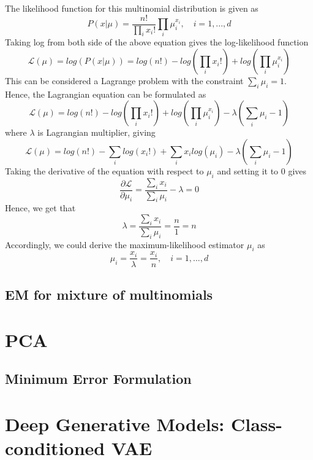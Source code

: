 \documentclass[12pt,a4paper]{article}
\begin{document}
	\noindent The likelihood function for this multinomial distribution is given as
	\begin{equation}
		P(x|\mu) = \frac{n!}{\prod_{i}x_i!}\prod_{i}\mu^{x_i}_i,\quad i=1, ..., d
	\end{equation}
	Taking log from both side of the above equation gives the log-likelihood function
	\begin{equation}
		\mathcal{L}(\mu) = log(P(x|\mu)) = log(n!)- log(\prod_{i}x_i!) +log(\prod_{i}\mu^{x_i}_i)
	\end{equation}
	This can be considered a Lagrange problem with the constraint $\sum_{i}\mu_i=1$. Hence, the Lagrangian equation can be formulated as
	\begin{equation}
		\mathcal{L}(\mu) = log(n!)- log(\prod_{i}x_i!) +log(\prod_{i}\mu^{x_i}_i) - \lambda(\sum_{i}\mu_i-1)
	\end{equation}
where $\lambda$ is Lagrangian multiplier, giving
\begin{equation}
	\mathcal{L}(\mu) = log(n!)- \sum_{i}log(x_i!) + \sum_{i}{x_i}log(\mu_i) - \lambda(\sum_{i}\mu_i-1)
\end{equation}
	Taking the derivative of the equation with respect to $\mu_i$ and setting it to 0 gives
	\begin{equation}
		\frac{\partial \mathcal{L}}{\partial \mu_i}= \frac{\sum_{i}x_i}{\sum_{i}\mu_i} - \lambda = 0
	\end{equation}
	Hence, we get that
	\begin{equation}
		 \lambda= \frac{\sum_{i}x_i}{\sum_{i}\mu_i} = \frac{n}{1} = n
	\end{equation}
	Accordingly, we could derive the maximum-likelihood estimator $\mu_i$ as
	\begin{equation}
		\mu_i= \frac{x_i}{\lambda} = \frac{x_i}{n},\quad i=1, ..., d
	\end{equation}


	\subsection{EM for mixture of multinomials}
	
	\section{PCA}
	\subsection{Minimum Error Formulation}
	
	\section{Deep Generative Models: Class-conditioned
VAE}

	
\end{document}
